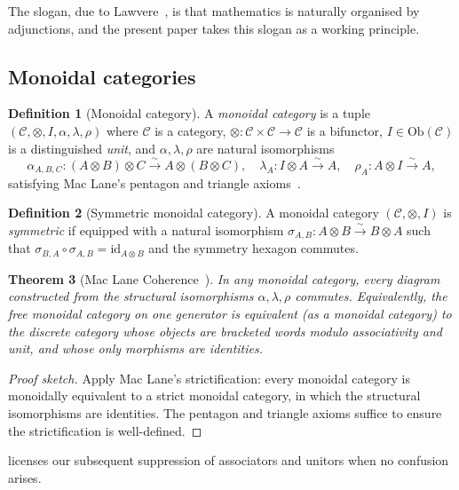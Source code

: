 \documentclass[12pt]{article}
\newtheorem{theorem}{Theorem}[section]
\theoremstyle{definition}
\newtheorem{definition}[theorem]{Definition}
\theoremstyle{remark}
\newcommand{\C}{\mathcal{C}}
\newcommand{\id}{\mathrm{id}}
\newcommand{\Ob}{\mathrm{Ob}}
\begin{document}
The slogan, due to Lawvere~\cite{lawvere1963}, is that mathematics is naturally organised by adjunctions, and the present paper takes this slogan as a working principle.

\subsection{Monoidal categories}

\begin{definition}[Monoidal category]
\label{def:monoidal}
A \emph{monoidal category} is a tuple $(\C, \otimes, I, \alpha, \lambda, \rho)$ where $\C$ is a category, $\otimes : \C \times \C \to \C$ is a bifunctor, $I \in \Ob(\C)$ is a distinguished \emph{unit}, and $\alpha, \lambda, \rho$ are natural isomorphisms
\[
\alpha_{A,B,C} : (A \otimes B) \otimes C \xrightarrow{\sim} A \otimes (B \otimes C),
\quad \lambda_A : I \otimes A \xrightarrow{\sim} A,
\quad \rho_A : A \otimes I \xrightarrow{\sim} A,
\]
satisfying Mac Lane's pentagon and triangle axioms~\cite{maclane1998}.
\end{definition}

\begin{definition}[Symmetric monoidal category]
A monoidal category $(\C, \otimes, I)$ is \emph{symmetric} if equipped with a natural isomorphism $\sigma_{A,B} : A \otimes B \xrightarrow{\sim} B \otimes A$ such that $\sigma_{B,A} \circ \sigma_{A,B} = \id_{A \otimes B}$ and the symmetry hexagon commutes.
\end{definition}

\begin{theorem}[Mac Lane Coherence~\cite{maclane1998}]
\label{thm:maclane}
In any monoidal category, every diagram constructed from the structural isomorphisms $\alpha, \lambda, \rho$ commutes. Equivalently, the free monoidal category on one generator is equivalent (as a monoidal category) to the discrete category whose objects are bracketed words modulo associativity and unit, and whose only morphisms are identities.
\end{theorem}

\begin{proof}[Proof sketch]
Apply Mac Lane's strictification: every monoidal category is monoidally equivalent to a strict monoidal category, in which the structural isomorphisms are identities. The pentagon and triangle axioms suffice to ensure the strictification is well-defined.
\end{proof}

 licenses our subsequent suppression of associators and unitors when no confusion arises.
\end{document}
